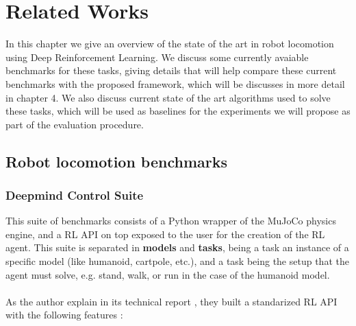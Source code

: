 
\chapter{Related Works}
\label{ch:relatedWorks}

In this chapter we give an overview of the state of the art in robot locomotion using 
Deep Reinforcement Learning. We discuss some currently avaiable benchmarks for these tasks,
giving details that will help compare these current benchmarks with the proposed framework, which
will be discusses in more detail in chapter 4. We also discuss current state of the art algorithms
used to solve these tasks, which will be used as baselines for the experiments we will propose as part
of the evaluation procedure.

\section{Robot locomotion benchmarks}

    \subsection{Deepmind Control Suite}
    This suite of benchmarks consists of a Python wrapper of the MuJoCo physics engine, and a RL API on top
    exposed to the user for the creation of the RL agent. This suite is separated in \textbf{models} and \textbf{tasks},
    being a task an instance of a specific model (like humanoid, cartpole, etc.), and a task being the setup that
    the agent must solve, e.g. stand, walk, or run in the case of the humanoid model.
    \\
    \\
    As the author explain in its technical report \citep{Controlsuite}, they built a standarized RL API with 
    the following features :

